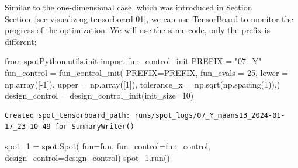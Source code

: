\documentclass[
  letterpaper,
  DIV=11,
  numbers=noendperiod]{scrreprt}
\newenvironment{Shaded}{\begin{snugshade}}{\end{snugshade}}
\newcommand{\DecValTok}[1]{\textcolor[rgb]{0.68,0.00,0.00}{#1}}
\newcommand{\ImportTok}[1]{\textcolor[rgb]{0.00,0.46,0.62}{#1}}
\newcommand{\NormalTok}[1]{\textcolor[rgb]{0.00,0.23,0.31}{#1}}
\newcommand{\OperatorTok}[1]{\textcolor[rgb]{0.37,0.37,0.37}{#1}}
\newcommand{\StringTok}[1]{\textcolor[rgb]{0.13,0.47,0.30}{#1}}
\begin{document}
\begin{tcolorbox}[enhanced jigsaw, coltitle=black, bottomrule=.15mm, breakable, toprule=.15mm, colframe=quarto-callout-note-color-frame, title=\textcolor{quarto-callout-note-color}{\faInfo}\hspace{0.5em}{TensorBoard}, colbacktitle=quarto-callout-note-color!10!white, opacityback=0, left=2mm, leftrule=.75mm, colback=white, rightrule=.15mm, bottomtitle=1mm, toptitle=1mm, titlerule=0mm, arc=.35mm, opacitybacktitle=0.6]

Similar to the one-dimensional case, which was introduced in Section
Section~\ref{sec-visualizing-tensorboard-01}, we can use TensorBoard to
monitor the progress of the optimization. We will use the same code,
only the prefix is different:

\begin{Shaded}
\begin{Highlighting}[]
\ImportTok{from}\NormalTok{ spotPython.utils.init }\ImportTok{import}\NormalTok{ fun\_control\_init}
\NormalTok{PREFIX }\OperatorTok{=} \StringTok{"07\_Y"}
\NormalTok{fun\_control }\OperatorTok{=}\NormalTok{ fun\_control\_init(}
\NormalTok{    PREFIX}\OperatorTok{=}\NormalTok{PREFIX,}
\NormalTok{    fun\_evals }\OperatorTok{=} \DecValTok{25}\NormalTok{,}
\NormalTok{    lower }\OperatorTok{=}\NormalTok{ np.array([}\OperatorTok{{-}}\DecValTok{1}\NormalTok{]),}
\NormalTok{    upper }\OperatorTok{=}\NormalTok{ np.array([}\DecValTok{1}\NormalTok{]),}
\NormalTok{    tolerance\_x }\OperatorTok{=}\NormalTok{ np.sqrt(np.spacing(}\DecValTok{1}\NormalTok{)),)}
\NormalTok{design\_control }\OperatorTok{=}\NormalTok{ design\_control\_init(init\_size}\OperatorTok{=}\DecValTok{10}\NormalTok{)}
\end{Highlighting}
\end{Shaded}

\begin{verbatim}
Created spot_tensorboard_path: runs/spot_logs/07_Y_maans13_2024-01-17_23-10-49 for SummaryWriter()
\end{verbatim}

\end{tcolorbox}

\begin{Shaded}
\begin{Highlighting}[]
\NormalTok{spot\_1 }\OperatorTok{=}\NormalTok{ spot.Spot(}
\NormalTok{            fun}\OperatorTok{=}\NormalTok{fun,}
\NormalTok{            fun\_control}\OperatorTok{=}\NormalTok{fun\_control,}
\NormalTok{            design\_control}\OperatorTok{=}\NormalTok{design\_control)}
\NormalTok{spot\_1.run()}
\end{Highlighting}
\end{Shaded}
\end{document}
